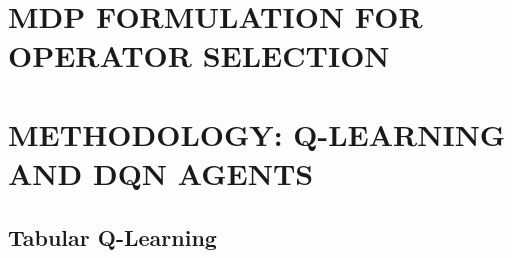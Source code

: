 \documentclass[final,11pt,times]{elsarticle}
\begin{document}


\section{MDP FORMULATION FOR OPERATOR SELECTION}
\label{sec:mdp}




\section{METHODOLOGY: Q-LEARNING AND DQN AGENTS}
\label{sec:agents}

\subsection{Tabular Q-Learning}

\end{document}
